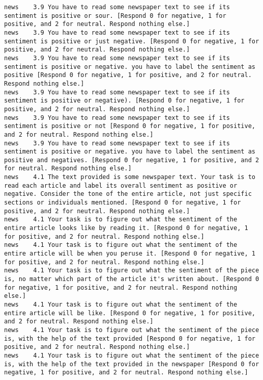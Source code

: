 \begin{lstlisting}[label=lst:promptvariants]
news	3.9	You have to read some newspaper text to see if its sentiment is positive or sour. [Respond 0 for negative, 1 for positive, and 2 for neutral. Respond nothing else.]
news	3.9	You have to read some newspaper text to see if its sentiment is positive or just negative. [Respond 0 for negative, 1 for positive, and 2 for neutral. Respond nothing else.]
news	3.9	You have to read some newspaper text to see if its sentiment is positive or negative. you have to label the sentiment as positive [Respond 0 for negative, 1 for positive, and 2 for neutral. Respond nothing else.]
news	3.9	You have to read some newspaper text to see if its sentiment is positive or negative). [Respond 0 for negative, 1 for positive, and 2 for neutral. Respond nothing else.]
news	3.9	You have to read some newspaper text to see if its sentiment is positive or not [Respond 0 for negative, 1 for positive, and 2 for neutral. Respond nothing else.]
news	3.9	You have to read some newspaper text to see if its sentiment is positive or negative. you have to label the sentiment as positive and negatives. [Respond 0 for negative, 1 for positive, and 2 for neutral. Respond nothing else.]
news	4.1	The text provided is some newspaper text. Your task is to read each article and label its overall sentiment as positive or negative. Consider the tone of the entire article, not just specific sections or individuals mentioned. [Respond 0 for negative, 1 for positive, and 2 for neutral. Respond nothing else.]
news	4.1	Your task is to figure out what the sentiment of the entire article looks like by reading it. [Respond 0 for negative, 1 for positive, and 2 for neutral. Respond nothing else.]
news	4.1	Your task is to figure out what the sentiment of the entire article will be when you peruse it. [Respond 0 for negative, 1 for positive, and 2 for neutral. Respond nothing else.]
news	4.1	Your task is to figure out what the sentiment of the piece is, no matter which part of the article it's written about. [Respond 0 for negative, 1 for positive, and 2 for neutral. Respond nothing else.]
news	4.1	Your task is to figure out what the sentiment of the entire article will be like. [Respond 0 for negative, 1 for positive, and 2 for neutral. Respond nothing else.]
news	4.1	Your task is to figure out what the sentiment of the piece is, with the help of the text provided [Respond 0 for negative, 1 for positive, and 2 for neutral. Respond nothing else.]
news	4.1	Your task is to figure out what the sentiment of the piece is, with the help of the text provided in the newspaper [Respond 0 for negative, 1 for positive, and 2 for neutral. Respond nothing else.]

\end{lstlisting}
